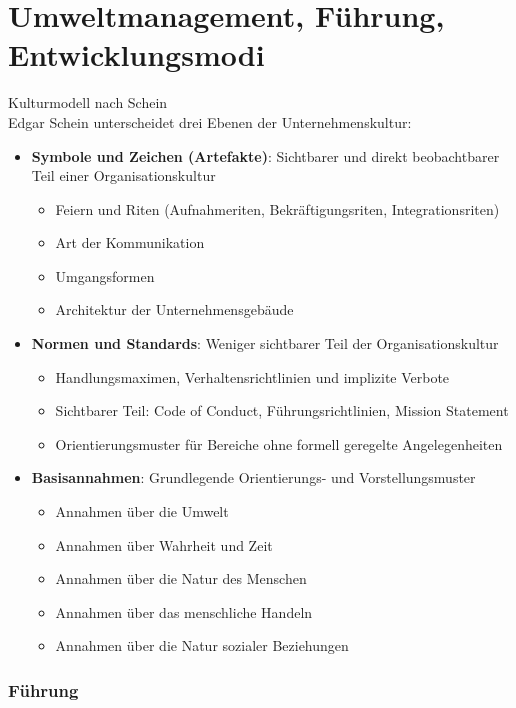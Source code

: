 \section{Umweltmanagement, Führung, Entwicklungsmodi}


\begin{concept}{Kulturmodell nach Schein}\\
Edgar Schein unterscheidet drei Ebenen der Unternehmenskultur:
\begin{itemize}
    \item \textbf{Symbole und Zeichen (Artefakte)}: Sichtbarer und direkt beobachtbarer Teil einer Organisationskultur
    \begin{itemize}
        \item Feiern und Riten (Aufnahmeriten, Bekräftigungsriten, Integrationsriten)
        \item Art der Kommunikation
        \item Umgangsformen
        \item Architektur der Unternehmensgebäude
    \end{itemize}
    \item \textbf{Normen und Standards}: Weniger sichtbarer Teil der Organisationskultur
    \begin{itemize}
        \item Handlungsmaximen, Verhaltensrichtlinien und implizite Verbote
        \item Sichtbarer Teil: Code of Conduct, Führungsrichtlinien, Mission Statement
        \item Orientierungsmuster für Bereiche ohne formell geregelte Angelegenheiten
    \end{itemize}
    \item \textbf{Basisannahmen}: Grundlegende Orientierungs- und Vorstellungsmuster
    \begin{itemize}
        \item Annahmen über die Umwelt
        \item Annahmen über Wahrheit und Zeit
        \item Annahmen über die Natur des Menschen
        \item Annahmen über das menschliche Handeln
        \item Annahmen über die Natur sozialer Beziehungen
    \end{itemize}
\end{itemize}
\end{concept}

\subsubsection{Führung}

